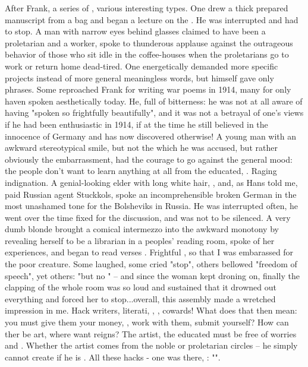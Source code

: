 
\missing After Frank, a series of , various interesting types. One drew a thick prepared manuscript from a bag and began a lecture on the . He was interrupted and had to stop. A man with narrow eyes behind glasses claimed to have been a proletarian and a worker, spoke to thunderous applause against the outrageous behavior of those who sit idle in the coffee-houses when the proletarians go to work or return home dead-tired. One energetically demanded more specific projects instead of more general meaningless words, but himself gave only phrases. Some reproached Frank for writing war poems in 1914, many for only haven spoken aesthetically today. He, full of bitterness: he was not at all aware of having "spoken so frightfully beautifully", and it was not a betrayal of one's views if he had been enthusiastic in 1914, if at the time he still believed in the innocence of Germany and has now discovered otherwise! A young man with an awkward stereotypical smile, but not the  which he was accused, but rather obviously the embarrassment, had the courage to go against the general mood: the people don't want to learn anything at all from the educated, . Raging indignation. A genial-looking elder with long white hair, , and, as Hans told me, paid Russian agent Stuckkols, spoke an incomprehensible broken German in the most unashamed tone for the Bolsheviks in Russia. He was interrupted often, he went over the time fixed for the discussion, and was not to be silenced. A very dumb blonde brought a comical intermezzo into the awkward monotony by revealing herself  to be a librarian in a peoples' reading room, spoke of her experiences, and began to read verses . Frightful , so that I was embarassed for the poor creature. Some laughed, some cried "stop", others bellowed "freedom of speech", yet others: "but no " -- and since the woman kept droning on, finally the clapping of the whole room was so loud and sustained that it drowned out everything and forced her to stop...overall, this assembly made a wretched impression in me. Hack writers, literati, , , cowards! What does that then mean: you must give them your money, , work with them, submit yourself? How can ther be art, where want reigns? The artist, the educated must be free of worries and . Whether the artist comes from the noble or proletarian circles -- he simply cannot create if he is . All these hacks - one was there, : "". 